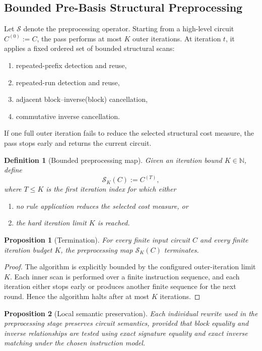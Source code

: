 \documentclass[11pt]{article}
\newtheorem{definition}{Definition}
\newtheorem{proposition}{Proposition}
\begin{document}
\subsection{Bounded Pre-Basis Structural Preprocessing}

Let $\mathcal{S}$ denote the preprocessing operator. Starting from a high-level circuit $C^{(0)} := C$, the pass performs at most $K$ outer iterations. At iteration $t$, it applies a fixed ordered set of bounded structural scans:
\begin{enumerate}[leftmargin=1.5em]
    \item repeated-prefix detection and reuse,
    \item repeated-run detection and reuse,
    \item adjacent block--inverse(block) cancellation,
    \item commutative inverse cancellation.
\end{enumerate}
If one full outer iteration fails to reduce the selected structural cost measure, the pass stops early and returns the current circuit.

\begin{definition}[Bounded preprocessing map]
Given an iteration bound $K \in \mathbb{N}$, define
\[
\mathcal{S}_K(C) := C^{(T)},
\]
where $T \le K$ is the first iteration index for which either
\begin{enumerate}[leftmargin=1.5em]
    \item no rule application reduces the selected cost measure, or
    \item the hard iteration limit $K$ is reached.
\end{enumerate}
\end{definition}

\begin{proposition}[Termination]
For every finite input circuit $C$ and every finite iteration budget $K$, the preprocessing map $\mathcal{S}_K(C)$ terminates.
\end{proposition}

\begin{proof}
The algorithm is explicitly bounded by the configured outer-iteration limit $K$. Each inner scan is performed over a finite instruction sequence, and each iteration either stops early or produces another finite sequence for the next round. Hence the algorithm halts after at most $K$ iterations.
\end{proof}

\begin{proposition}[Local semantic preservation]
Each individual rewrite used in the preprocessing stage preserves circuit semantics, provided that block equality and inverse relationships are tested using exact signature equality and exact inverse matching under the chosen instruction model.
\end{proposition}
\end{document}
